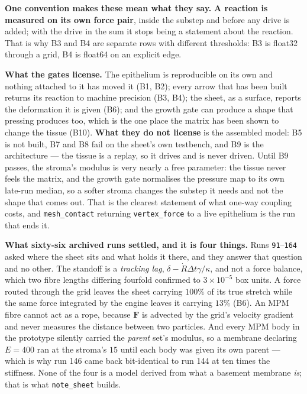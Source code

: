 \documentclass[10pt,a4paper]{article}
\newcommand{\code}[1]{\texttt{#1}}
\newcommand{\op}[1]{\texttt{#1}}
\begin{document}
\textbf{One convention makes these mean what they say.} \textbf{A reaction is measured on its own force
pair}, inside the substep and before any drive is added; with the drive in the sum it stops being a
statement about the reaction. That is why B3 and B4 are separate rows with different thresholds: B3 is
float32 through a grid, B4 is float64 on an explicit edge.

\textbf{What the gates license.} The epithelium is reproducible on its own and nothing attached to it
has moved it (B1, B2); every arrow that has been built returns its reaction to machine precision (B3,
B4); the sheet, as a surface, reports the deformation it is given (B6); and the growth gate can produce
a shape that pressing produces too, which is the one place the matrix has been shown to change the
tissue (B10). \textbf{What they do not license} is the assembled model: B5 is not built, B7 and B8 fail
on the sheet's own testbench, and B9 is the architecture --- the tissue is a replay, so it drives and
is never driven. Until B9 passes, the stroma's modulus is very nearly a free parameter: the tissue never
feels the matrix, and the growth gate normalises the pressure map to its own late-run median, so a
softer stroma changes the substep it needs and not the shape that comes out. That is the clearest
statement of what one-way coupling costs, and \op{mesh\_contact} returning \code{vertex\_force} to a
live epithelium is the run that ends it.

\textbf{What sixty-six archived runs settled, and it is four things.} Runs \op{91}--\op{164} asked
where the sheet sits and what holds it there, and they answer that question and no other. The standoff
is a \emph{tracking lag}, $\delta-\dot R\Delta t\gamma/\kappa$, and not a force balance, which two
fibre lengths differing fourfold confirmed to $3\times10^{-5}$ box units. A force routed through the
grid leaves the sheet carrying $100\%$ of its true stretch while the same force integrated by the
engine leaves it carrying $13\%$ (B6). An MPM fibre cannot act as a rope, because $\mathbf F$ is
advected by the grid's velocity gradient and never measures the distance between two particles. And
every MPM body in the prototype silently carried the \emph{parent} set's modulus, so a membrane
declaring $E=400$ ran at the stroma's $15$ until each body was given its own parent --- which is why
run 146 came back bit-identical to run 144 at ten times the stiffness. None of the four is a model
derived from what a basement membrane \emph{is}; that is what \code{note\_sheet} builds.
\end{document}
